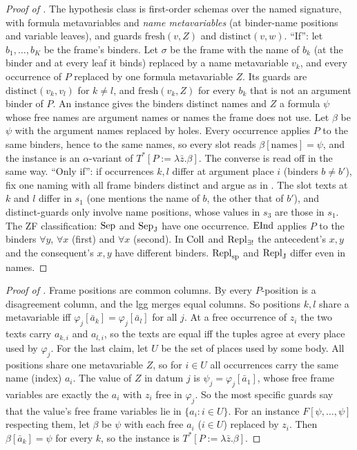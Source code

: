 \begin{proof}[Proof of ]
 The hypothesis class is first-order schemas over the named signature, with formula
metavariables and \emph{name metavariables} (at binder-name positions and variable leaves), and guards
$\mathrm{fresh}(v,Z)$ and $\mathrm{distinct}(v,w)$.
``If'': let $b_1,\dots,b_K$ be the frame's binders. Let $\sigma$ be the frame with the name of $b_k$ (at the binder and
at every leaf it binds) replaced by a name metavariable $v_k$, and every occurrence of $P$ replaced by one formula
metavariable $Z$. Its guards are $\mathrm{distinct}(v_k,v_l)$ for $k\ne l$, and $\mathrm{fresh}(v_k,Z)$ for every $b_k$
that is not an argument binder of $P$. An instance gives the binders distinct names and $Z$ a formula $\psi$ whose free
names are argument names or names the frame does not use. Let $\beta$ be $\psi$ with the argument names replaced by holes.
Every occurrence applies $P$ to the same binders, hence to the same names, so every slot reads $\beta[\text{names}]=\psi$,
and the instance is an $\alpha$-variant of $T^*[P:=\lambda\bar z.\beta]$. The converse is read off in the same way.
``Only if'': if occurrences $k,l$ differ at argument place $i$ (binders $b\ne b'$), fix one naming with all frame
binders distinct and argue as in . The slot texts at $k$ and $l$ differ in $s_1$ (one mentions the
name of $b$, the other that of $b'$), and distinct-guards only involve name positions, whose values in $s_3$ are those in
$s_1$. The ZF classification: $\mathrm{Sep}$ and $\mathrm{Sep}_{\mathrm J}$ have one occurrence. $\mathrm{EInd}$ applies $P$ to the binders
$\forall y$, $\forall x$ (first) and $\forall x$ (second). In $\mathrm{Coll}$ and $\mathrm{Repl}_{\exists!}$ the antecedent's $x,y$ and the
consequent's $x,y$ have different binders. $\mathrm{Repl}_{\mathrm{sp}}$ and $\mathrm{Repl}_{\mathrm{J}}$ differ even in names.
\end{proof}

\begin{proof}[Proof of ]
Frame positions are common columns. By \evR{} every $P$-position is a disagreement column, and the lgg merges equal
columns. So positions $k,l$ share a metavariable iff $\varphi_j[\bar a_k]=\varphi_j[\bar a_l]$ for all $j$. At a free
occurrence of $z_i$ the two texts carry $a_{k,i}$ and $a_{l,i}$, so the texts are equal iff the tuples agree at every
place used by $\varphi_j$.
For the last claim, let $U$ be the set of places used by some body. All positions share one metavariable $Z$, so for
$i\in U$ all occurrences carry the same name (index) $a_i$. The value of $Z$ in datum $j$ is $\psi_j=\varphi_j[\bar a_1]$,
whose free frame variables are exactly the $a_i$ with $z_i$ free in $\varphi_j$. So the most specific guards say that
the value's free frame variables lie in $\{a_i:i\in U\}$. For an instance $F[\psi,\dots,\psi]$ respecting them, let
$\beta$ be $\psi$ with each free $a_i$ ($i\in U$) replaced by $z_i$. Then $\beta[\bar a_k]=\psi$ for every $k$, so the
instance is $T^*[P:=\lambda\bar z.\beta]$.
\end{proof}

